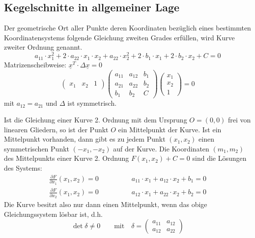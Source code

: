 \subsection{Kegelschnitte in allgemeiner Lage}
Der geometrische Ort aller Punkte deren Koordinaten bez\"uglich eines bestimmten Koordinatensystems
folgende Gleichung zweiten Grades erf\"ullen, wird Kurve zweiter Ordnung genannt.
\begin{equation}
  a_{11}\cdot x_1^2 + 2\cdot a_{22}\cdot x_1\cdot x_2 + a_{22}\cdot x_2^2 + 2\cdot b_1 \cdot x_1 + 2\cdot b_2\cdot x_2 + C = 0
\end{equation}
\noindent Matrizenscheibweise: $\underline{x}^T\cdot\Delta\underline{x} = 0$
\begin{equation}
  \begin{pmatrix}x_1 & x_2 & 1 \end{pmatrix}
	\begin{pmatrix}
		a_{11} & a_{12} & b_1 \\
		a_{21} & a_{22} & b_2 \\
		b_1    & b_2    & C
	\end{pmatrix}\begin{pmatrix}x_1 \\ x_2 \\ 1 \end{pmatrix} = 0
\end{equation}
\noindent mit $a_{12} = a_{21}$ und $\Delta$ ist symmetrisch.

\noindent Ist die Gleichung einer Kurve 2. Ordnung mit dem Ursprung $O = (0, 0)$ frei von linearen Gliedern, so ist der Punkt $O$ ein Mittelpunkt der Kurve.
\noindent Ist ein Mittelpunkt vorhanden, dann gibt es zu jedem Punkt $(x_1, x_2)$ einen symmetrischen Punkt $(-x_1, -x_2)$ auf der Kurve.
\noindent Die Koordinaten $(m_1, m_2)$ des Mittelpunkts einer Kurve 2. Ordnung $F(x_1, x_2) + C = 0$ sind die L\"osungen des Systems:
\begin{align}
  \frac{\partial F}{\partial x_1}(x_1, x_2) = 0 \qquad&\qquad a_{11}\cdot x_1 + a_{12}\cdot x_2 + b_1 = 0 \\
  \frac{\partial F}{\partial x_2}(x_1, x_2) = 0 \qquad&\qquad a_{12}\cdot x_1 + a_{22}\cdot x_2 + b_2 = 0
\end{align}
Die Kurve besitzt also nur dann einen Mittelpunkt, wenn das obige Gleichungssystem l\"osbar ist, d.h.
\begin{equation}
  \det{\delta} \neq 0 \qquad\text{mit}\quad\delta=\begin{pmatrix} a_{11} & a_{12} \\ a_{12} & a_{22} \end{pmatrix}
\end{equation}

